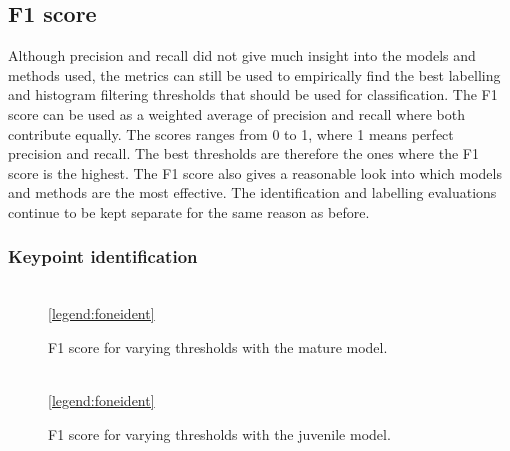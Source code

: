 \subsection{F1 score}
Although precision and recall did not give much insight into the models and methods used, the metrics can still be used to empirically find the best labelling and histogram filtering thresholds that should be used for classification. The F1 score can be used as a weighted average of precision and recall where both contribute equally. The scores ranges from 0 to 1, where 1 means perfect precision and recall. The best thresholds are therefore the ones where the F1 score is the highest. The F1 score also gives a reasonable look into which models and methods are the most effective. The identification and labelling evaluations continue to be kept separate for the same reason as before. 
\subsubsection{Keypoint identification}

\begin{figure}[H]
\centering
{}
\\
\ref{legend:foneident}
\caption{F1 score for varying thresholds with the mature model.}
\label{fig:fonemature}
\end{figure}

\begin{figure}[H]
\centering
{}
\\
\ref{legend:foneident}
\caption{F1 score for varying thresholds with the juvenile model.}
\label{fig:fonejuvenile}
\end{figure}

